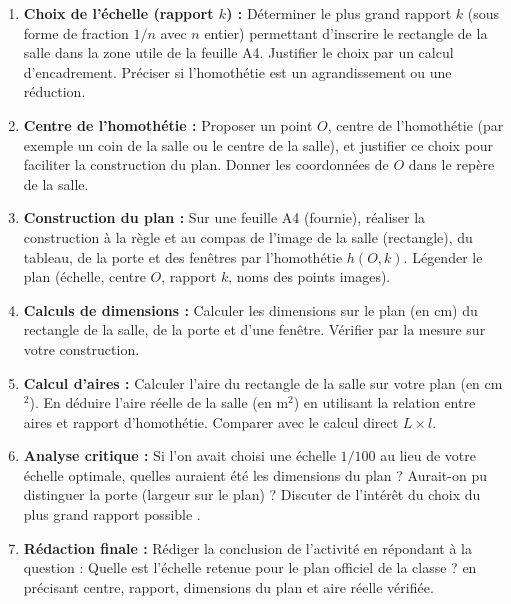 \documentclass[11pt]{article}
\begin{document}
\begin{enumerate}
    \item \textbf{Choix de l'échelle (rapport $k$) :} Déterminer le plus grand rapport $k$ (sous forme de fraction $1/n$ avec $n$ entier) permettant d'inscrire le rectangle de la salle dans la zone utile de la feuille A4. Justifier le choix par un calcul d'encadrement. Préciser si l'homothétie est un agrandissement ou une réduction.
    \item \textbf{Centre de l'homothétie :} Proposer un point $O$, centre de l'homothétie (par exemple un coin de la salle ou le centre de la salle), et justifier ce choix pour faciliter la construction du plan. Donner les coordonnées de $O$ dans le repère de la salle.
    \item \textbf{Construction du plan :} Sur une feuille A4 (fournie), réaliser la construction à la règle et au compas de l'image de la salle (rectangle), du tableau, de la porte et des fenêtres par l'homothétie $h(O, k)$. Légender le plan (échelle, centre $O$, rapport $k$, noms des points images).
    \item \textbf{Calculs de dimensions :} Calculer les dimensions sur le plan (en cm) du rectangle de la salle, de la porte et d'une fenêtre. Vérifier par la mesure sur votre construction.
    \item \textbf{Calcul d'aires :} Calculer l'aire du rectangle de la salle sur votre plan (en cm$^2$). En déduire l'aire réelle de la salle (en m$^2$) en utilisant la relation entre aires et rapport d'homothétie. Comparer avec le calcul direct $L \times l$.
    \item \textbf{Analyse critique :} Si l'on avait choisi une échelle $1/100$ au lieu de votre échelle optimale, quelles auraient été les dimensions du plan ? Aurait-on pu distinguer la porte (largeur sur le plan) ? Discuter de l'intérêt du choix du \og plus grand rapport possible \fg.
    \item \textbf{Rédaction finale :} Rédiger la conclusion de l'activité en répondant à la question : \og Quelle est l'échelle retenue pour le plan officiel de la classe ? \fg{} en précisant centre, rapport, dimensions du plan et aire réelle vérifiée.
\end{enumerate}
\end{document}
